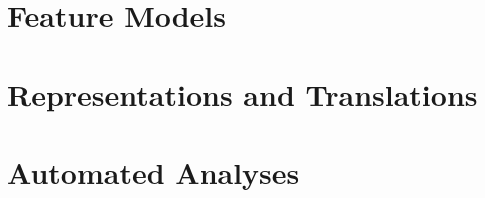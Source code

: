 

\subtitle{4. Feature Modeling}
\author{Elias Kuiter}






\section{Feature Models}



\lessonslearned{
	\item \ldots
}{
	\item \ldots
}{
	\ldots
}

\sectionend

\section{Representations and Translations}



\lessonslearned{
	\item \ldots
}{
	\item \ldots
}{
	\ldots
}

\sectionend

\section{Automated Analyses}



\lessonslearned{
	\item \ldots
}{
	\item \ldots
}{
	\ldots
}




